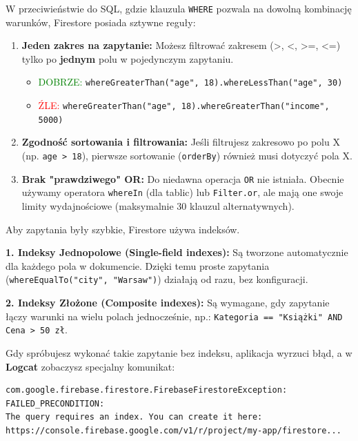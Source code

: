 W przeciwieństwie do SQL, gdzie klauzula \texttt{WHERE} pozwala na dowolną kombinację warunków, Firestore posiada sztywne reguły:

\begin{enumerate}
    \item \textbf{Jeden zakres na zapytanie:}
    Możesz filtrować zakresem (>, <, >=, <=) tylko po \textbf{jednym} polu w pojedynczym zapytaniu.
    \begin{itemize}
        \item \textcolor{green}{DOBRZE:} \texttt{whereGreaterThan("age", 18).whereLessThan("age", 30)}
        \item \textcolor{red}{ŹLE:} \texttt{whereGreaterThan("age", 18).whereGreaterThan("income", 5000)}
    \end{itemize}
    
    \item \textbf{Zgodność sortowania i filtrowania:}
    Jeśli filtrujesz zakresowo po polu X (np. \texttt{age > 18}), pierwsze sortowanie (\texttt{orderBy}) również musi dotyczyć pola X.
    
    \item \textbf{Brak "prawdziwego" OR:}
    Do niedawna operacja \texttt{OR} nie istniała. Obecnie używamy operatora \texttt{whereIn} (dla tablic) lub \texttt{Filter.or}, ale mają one swoje limity wydajnościowe (maksymalnie 30 klauzul alternatywnych).
\end{enumerate}

Aby zapytania były szybkie, Firestore używa indeksów.

\textbf{1. Indeksy Jednopolowe (Single-field indexes):}
Są tworzone automatycznie dla każdego pola w dokumencie. Dzięki temu proste zapytania (\texttt{whereEqualTo("city", "Warsaw")}) działają od razu, bez konfiguracji.

\textbf{2. Indeksy Złożone (Composite indexes):}
Są wymagane, gdy zapytanie łączy warunki na wielu polach jednocześnie, np.:
\texttt{Kategoria == "Książki" AND Cena > 50 zł}.

Gdy spróbujesz wykonać takie zapytanie bez indeksu, aplikacja wyrzuci błąd, a w \textbf{Logcat} zobaczysz specjalny komunikat:

\begin{verbatim}
com.google.firebase.firestore.FirebaseFirestoreException: FAILED_PRECONDITION: 
The query requires an index. You can create it here: 
https://console.firebase.google.com/v1/r/project/my-app/firestore...
\end{verbatim}

